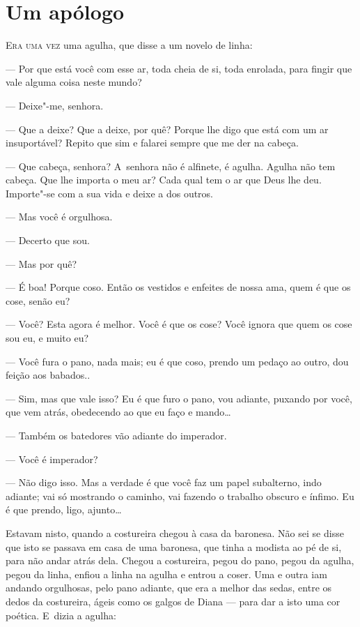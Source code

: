 \chapter{Um apólogo}

\begin{linenumbers}

\textsc{Era uma vez} uma agulha, que disse a um novelo de linha:

--- Por que está você com esse ar, toda cheia de si, toda enrolada, para
fingir que vale alguma coisa neste mundo?

--- Deixe"-me, senhora.

--- Que a deixe? Que a deixe, por quê? Porque lhe digo que está com um ar
insuportável? Repito que sim e falarei sempre que me der na cabeça.

--- Que cabeça, senhora? A~senhora não é alfinete, é agulha. Agulha não
tem cabeça. Que lhe importa o meu ar? Cada qual tem o ar que Deus lhe
deu. Importe"-se com a sua vida e deixe a dos outros.

--- Mas você é orgulhosa.

--- Decerto que sou.

--- Mas por quê?

--- É boa! Porque coso. Então os vestidos e enfeites de nossa ama, quem é
que os cose, senão eu?

--- Você? Esta agora é melhor. Você é que os cose? Você ignora que quem
os cose sou eu, e muito eu?

--- Você fura o pano, nada mais; eu é que coso, prendo um pedaço ao
outro, dou feição aos babados..

--- Sim, mas que vale isso? Eu é que furo o pano, vou adiante, puxando
por você, que vem atrás, obedecendo ao que eu faço e mando\ldots{}

--- Também os batedores vão adiante do imperador.

--- Você é imperador?

--- Não digo isso. Mas a verdade é que você faz um papel subalterno, indo
adiante; vai só mostrando o caminho, vai fazendo o trabalho obscuro e
ínfimo. Eu é que prendo, ligo, ajunto\ldots{}

Estavam nisto, quando a costureira chegou à casa da baronesa. Não sei se
disse que isto se passava em casa de uma baronesa, que tinha a modista
ao pé de si, para não andar atrás dela. Chegou a costureira, pegou do
pano, pegou da agulha, pegou da linha, enfiou a linha na agulha e entrou
a coser. Uma e outra iam andando orgulhosas, pelo pano adiante, que era
a melhor das sedas, entre os dedos da costureira, ágeis como os galgos
de Diana --- para dar a isto uma cor poética. E~dizia a agulha:


\end{linenumbers}
